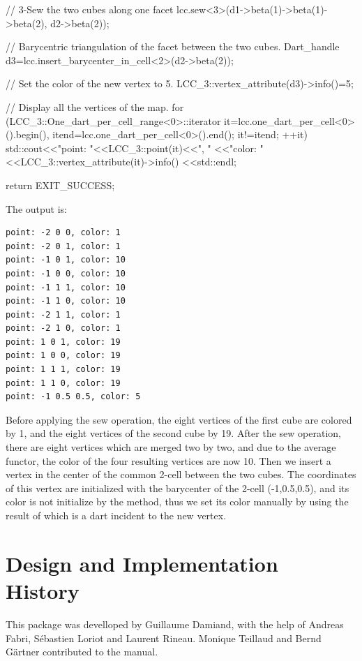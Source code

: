 \begin{ccExampleCode}
{  // 3-Sew the two cubes along one facet
  lcc.sew<3>(d1->beta(1)->beta(1)->beta(2), d2->beta(2));

  // Barycentric triangulation of the facet between the two cubes.
  Dart_handle d3=lcc.insert_barycenter_in_cell<2>(d2->beta(2));

  // Set the color of the new vertex to 5.
  LCC_3::vertex_attribute(d3)->info()=5;
  
  // Display all the vertices of the map.
  for (LCC_3::One_dart_per_cell_range<0>::iterator 
       it=lcc.one_dart_per_cell<0>().begin(), 
       itend=lcc.one_dart_per_cell<0>().end(); 
       it!=itend; ++it)
    {
      std::cout<<"point: "<<LCC_3::point(it)<<", "
               <<"color: "<<LCC_3::vertex_attribute(it)->info()
               <<std::endl;
    }

  return EXIT_SUCCESS;
}
\end{ccExampleCode}

The output is:
\begin{verbatim}
point: -2 0 0, color: 1
point: -2 0 1, color: 1
point: -1 0 1, color: 10
point: -1 0 0, color: 10
point: -1 1 1, color: 10
point: -1 1 0, color: 10
point: -2 1 1, color: 1
point: -2 1 0, color: 1
point: 1 0 1, color: 19
point: 1 0 0, color: 19
point: 1 1 1, color: 19
point: 1 1 0, color: 19
point: -1 0.5 0.5, color: 5
\end{verbatim}

Before applying the sew operation, the eight vertices of the first
cube are colored by 1, and the eight vertices of the second cube by
19. After the sew operation, there are eight vertices which are merged
two by two, and due to the average functor, the color of the four
resulting vertices are now 10. Then we insert a vertex in the center
of the common 2-cell between the two cubes.  The coordinates of this
vertex are initialized with the barycenter of the 2-cell
(-1,0.5,0.5), and its color is not initialize by the method, thus we
set its color manually by using the result of
 which is a dart incident to the
new vertex.

\section{Design and Implementation History}
%
This package was develloped by Guillaume Damiand, with the help of
Andreas Fabri, S\'ebastien Loriot and Laurent Rineau.  Monique
Teillaud and Bernd G{\"a}rtner contributed to the manual.
